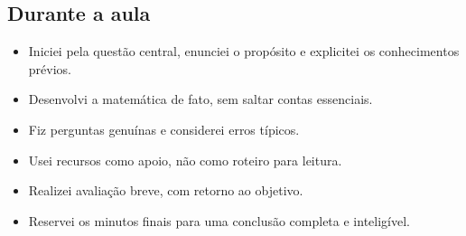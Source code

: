 \documentclass[11pt,a4paper]{article}
\begin{document}
\subsection*{Durante a aula}
\begin{itemize}[label=$\square$]
\item Iniciei pela questão central, enunciei o propósito e explicitei os conhecimentos prévios.
\item Desenvolvi a matemática de fato, sem saltar contas essenciais.
\item Fiz perguntas genuínas e considerei erros típicos.
\item Usei recursos como apoio, não como roteiro para leitura.
\item Realizei avaliação breve, com retorno ao objetivo.
\item Reservei os minutos finais para uma conclusão completa e inteligível.
\end{itemize}
\end{document}
